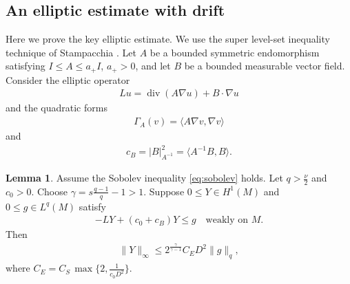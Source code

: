 \documentclass[11pt]{amsart}
\DeclareMathOperator{\diver}{div}
\theoremstyle{definition}
\newtheorem{lemma}[theorem]{Lemma}
\begin{document}
\subsection{An elliptic estimate with drift} Here we prove the key elliptic estimate.  We use the super level-set inequality technique of Stampacchia \cite[Lemma 4.1]{Stampacchia1965}.
Let $A$ be a bounded symmetric endomorphism satisfying $I\leq A \leq a_+I$, $a_+>0$, and let $B$ be a bounded measurable vector field. Consider the elliptic operator
\begin{align*}
    Lu=\diver(A\nabla u)+B\cdot \nabla u
\end{align*}
and the quadratic forms
\begin{align*}
    \Gamma_A(v)=\langle A\nabla v,\nabla v\rangle
\end{align*}
and
\begin{align*}
c_B=|B|^2_{A^{-1}}=\langle A^{-1}B,B\rangle.
\end{align*}
\begin{lemma}\label{mainlemma}
    Assume the Sobolev inequality \eqref{eq:sobolev} holds. Let $q>\frac{\nu}{2}$ and $c_0>0$. Choose $\gamma=s\frac{q-1}{q}-1>1.$
    Suppose $0\leq Y \in H^1(M)$ and $0\leq g\in L^q(M)$ satisfy
    \begin{align*}
        -LY+(c_0+c_B)Y\leq g \quad \text{weakly on }M.
    \end{align*}
    Then
    \begin{align*}
        \|Y\|_\infty \leq 2^{\frac{\gamma}{\gamma -1}}C_ED^2\|g\|_q,
    \end{align*}
    where $C_E=C_S\,\max\{2,\frac{1}{c_0D^2}\}$.
\end{lemma}
\end{document}
